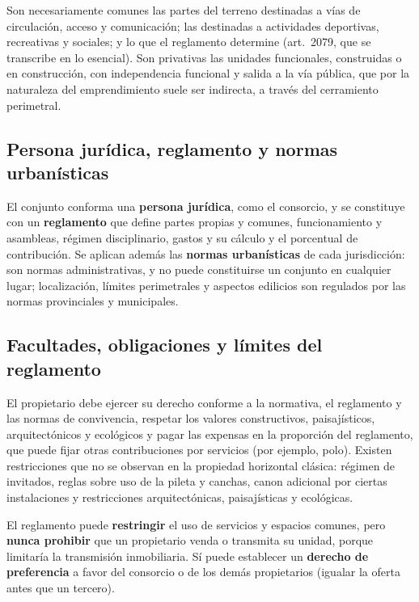 \documentclass[12pt,oneside]{book}
\begin{document}
Son necesariamente comunes las partes del terreno destinadas a vías de circulación, acceso y comunicación; las destinadas a actividades deportivas, recreativas y sociales; y lo que el reglamento determine (art.~2079, que se transcribe en lo esencial). Son privativas las unidades funcionales, construidas o en construcción, con independencia funcional y salida a la vía pública, que por la naturaleza del emprendimiento suele ser indirecta, a través del cerramiento perimetral.

\subsection{Persona jurídica, reglamento y normas urbanísticas}

El conjunto conforma una \textbf{persona jurídica}, como el consorcio, y se constituye con un \textbf{reglamento} que define partes propias y comunes, funcionamiento y asambleas, régimen disciplinario, gastos y su cálculo y el porcentual de contribución. Se aplican además las \textbf{normas urbanísticas} de cada jurisdicción: son normas administrativas, y no puede constituirse un conjunto en cualquier lugar; localización, límites perimetrales y aspectos edilicios son regulados por las normas provinciales y municipales.

\subsection{Facultades, obligaciones y límites del reglamento}

El propietario debe ejercer su derecho conforme a la normativa, el reglamento y las normas de convivencia, respetar los valores constructivos, paisajísticos, arquitectónicos y ecológicos y pagar las expensas en la proporción del reglamento, que puede fijar otras contribuciones por servicios (por ejemplo, polo). Existen restricciones que no se observan en la propiedad horizontal clásica: régimen de invitados, reglas sobre uso de la pileta y canchas, canon adicional por ciertas instalaciones y restricciones arquitectónicas, paisajísticas y ecológicas.

\begin{importante}
El reglamento puede \textbf{restringir} el uso de servicios y espacios comunes, pero \textbf{nunca prohibir} que un propietario venda o transmita su unidad, porque limitaría la transmisión inmobiliaria. Sí puede establecer un \textbf{derecho de preferencia} a favor del consorcio o de los demás propietarios (igualar la oferta antes que un tercero).
\end{importante}
\end{document}
